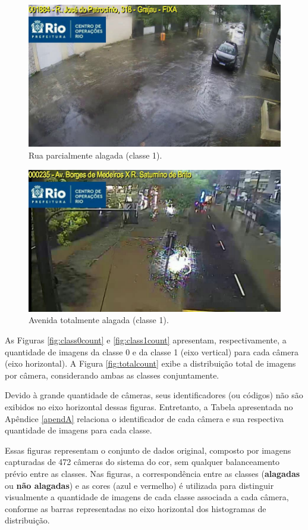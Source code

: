 \begin{figure}[htb]
\centerline{\includegraphics[width=0.8\linewidth]{images/1/CODE1884 2023-08-20 12-56-29-9.jpg}}
\caption{Rua parcialmente alagada (classe 1).}
\label{fig:class1_1}
\end{figure}

\begin{figure}[htb]
\centerline{\includegraphics[width=0.8\linewidth]{images/1/CODE235 2023-02-07 20-11-08-9.jpg}}
\caption{Avenida totalmente alagada (classe 1).}
\label{fig:class1_2}
\end{figure}

As Figuras \ref{fig:class0count} e \ref{fig:class1count} apresentam, respectivamente, a quantidade de imagens da classe 0 e da classe 1 (eixo vertical) para cada câmera (eixo horizontal).
A Figura \ref{fig:totalcount} exibe a distribuição total de imagens por câmera, considerando ambas as classes conjuntamente.

Devido à grande quantidade de câmeras, seus identificadores (ou códigos) não são exibidos no eixo horizontal dessas figuras.
Entretanto, a Tabela apresentada no Apêndice \ref{apendA} relaciona o identificador de cada câmera e sua respectiva quantidade de imagens para cada classe.

Essas figuras representam o conjunto de dados original, composto por imagens capturadas de 472 câmeras do sistema do \acrshort{cor}, sem qualquer balanceamento prévio entre as classes.
Nas figuras, a correspondência entre as classes (\textbf{alagadas} ou \textbf{não alagadas}) e as cores (azul e vermelho) é utilizada para distinguir visualmente a quantidade de imagens de cada classe associada a cada câmera, conforme as barras representadas no eixo horizontal dos histogramas de distribuição.

